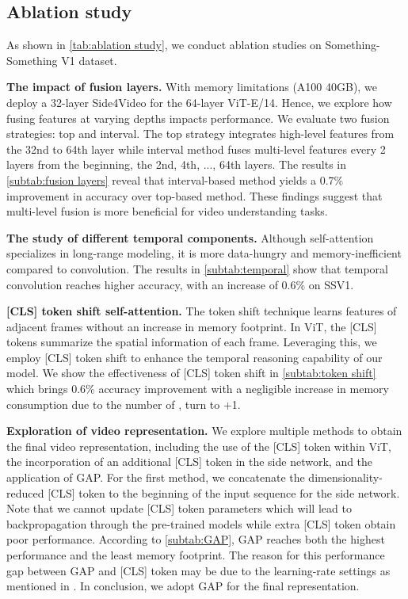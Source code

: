 \documentclass[10pt,twocolumn,letterpaper]{article}
\begin{document}
\subsection{Ablation study} 
\label{subsec: ablation study}
As shown in \cref{tab:ablation study}, we conduct ablation studies on Something-Something V1 dataset.


\noindent\textbf{The impact of fusion layers.} With memory limitations (A100 40GB), we deploy a 32-layer Side4Video for the 64-layer ViT-E/14. Hence, we explore how fusing features at varying depths impacts performance. We evaluate two fusion strategies: top and interval. The top strategy integrates high-level features from the 32nd to 64th layer while interval method fuses multi-level features every 2 layers from the beginning, \ie the 2nd, 4th, ..., 64th layers. The results in \cref{subtab:fusion layers} reveal that interval-based method yields a 0.7\% improvement in accuracy over top-based method. These findings suggest that multi-level fusion is more beneficial for video understanding tasks. 

\noindent\textbf{The study of different temporal components.} Although self-attention specializes in long-range modeling, it is more data-hungry and memory-inefficient compared to convolution. The results in \cref{subtab:temporal} show that temporal convolution reaches higher accuracy, with an increase of 0.6\% on SSV1.

\noindent\textbf{[CLS] token shift self-attention.} The token shift technique learns features of adjacent frames without an increase in memory footprint. In ViT, the [CLS] tokens summarize the spatial information of each frame. Leveraging this, we employ [CLS] token shift to enhance the temporal reasoning capability of our model. We show the effectiveness of [CLS] token shift in \cref{subtab:token shift} which brings 0.6\% accuracy improvement with a negligible increase in memory consumption due to the number of , turn to +1. 

\noindent\textbf{Exploration of video representation.} We explore multiple methods to obtain the final video representation, including the use of the [CLS] token within ViT, the incorporation of an additional [CLS] token in the side network, and the application of GAP. For the first method, we concatenate the dimensionality-reduced [CLS] token to the beginning of the input sequence for the side network. Note that we cannot update [CLS] token parameters which will lead to backpropagation through the pre-trained models while extra [CLS] token obtain poor performance. According to \cref{subtab:GAP}, GAP reaches both the highest performance and the least memory footprint. The reason for this performance gap between GAP and [CLS] token may be due to the learning-rate settings as mentioned in \cite{vit}. In conclusion, we adopt GAP for the final representation.
\end{document}
